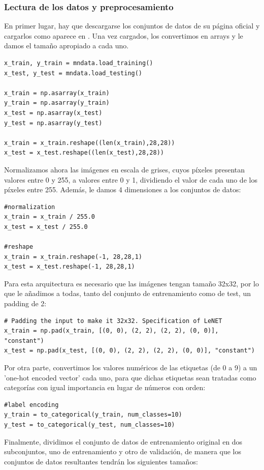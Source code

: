 \documentclass[a4paper,11pt]{article}
\begin{document}
\subsubsection{Lectura de los datos y preprocesamiento}
En primer lugar, hay que descargarse los conjuntos de datos de su página oficial \cite{11} y cargarlos como aparece en \cite{12}. Una vez cargados, los convertimos en arrays y le damos el tamaño apropiado a cada uno. 
\begin{verbatim}
x_train, y_train = mndata.load_training()
x_test, y_test = mndata.load_testing()

x_train = np.asarray(x_train)
y_train = np.asarray(y_train)
x_test = np.asarray(x_test)
y_test = np.asarray(y_test)

x_train = x_train.reshape((len(x_train),28,28))
x_test = x_test.reshape((len(x_test),28,28))
\end{verbatim}

Normalizamos ahora las imágenes en escala de grises, cuyos píxeles presentan valores entre 0 y 255, a valores entre 0 y 1, dividiendo el valor de cada uno de los píxeles entre 255. Además, le damos 4 dimensiones a los conjuntos de datos:
\begin{verbatim}
#normalization
x_train = x_train / 255.0
x_test = x_test / 255.0

#reshape
x_train = x_train.reshape(-1, 28,28,1)
x_test = x_test.reshape(-1, 28,28,1)
\end{verbatim}

Para esta arquitectura es necesario que las imágenes tengan tamaño 32x32, por lo que le añadimos a todas, tanto del conjunto de entrenamiento como de test, un padding de 2:
\begin{verbatim}
# Padding the input to make it 32x32. Specification of LeNET
x_train = np.pad(x_train, [(0, 0), (2, 2), (2, 2), (0, 0)], "constant") 
x_test = np.pad(x_test, [(0, 0), (2, 2), (2, 2), (0, 0)], "constant") 
\end{verbatim}

Por otra parte, convertimos los valores numéricos de las etiquetas (de 0 a 9) a un 'one-hot encoded vector' cada uno, para que dichas etiquetas sean tratadas como categorías con igual importancia en lugar de números con orden:
\begin{verbatim}
#label encoding
y_train = to_categorical(y_train, num_classes=10)
y_test = to_categorical(y_test, num_classes=10)
\end{verbatim}

Finalmente, dividimos el conjunto de datos de entrenamiento original en dos subconjuntos, uno de entrenamiento y otro de validación, de manera que los conjuntos de datos resultantes tendrán los siguientes tamaños:
\end{document}
